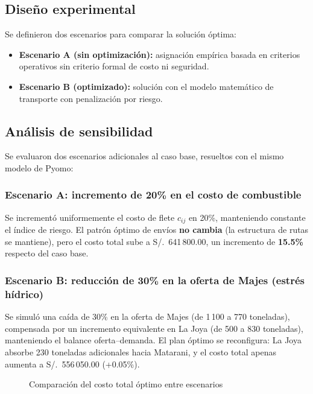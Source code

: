 \documentclass[11pt,a4paper]{article}
\begin{document}
\subsection{Dise\~no experimental}
Se definieron dos escenarios para comparar la soluci\'on \'optima:

\begin{itemize}
  \item \textbf{Escenario A (sin optimizaci\'on):} asignaci\'on emp\'irica basada en criterios operativos sin criterio formal de costo ni seguridad.
  \item \textbf{Escenario B (optimizado):} soluci\'on con el modelo matem\'atico de transporte con penalizaci\'on por riesgo.
\end{itemize}

\subsection{An\'alisis de sensibilidad}
\label{sec:sensibilidad}
Se evaluaron dos escenarios adicionales al caso base, resueltos con el mismo modelo de Pyomo:

\subsubsection*{Escenario A: incremento de 20\% en el costo de combustible}
Se increment\'o uniformemente el costo de flete $c_{ij}$ en 20\%, manteniendo constante el \'indice de riesgo. El patr\'on \'optimo de env\'ios \textbf{no cambia} (la estructura de rutas se mantiene), pero el costo total sube a S/.\ 641\,800.00, un incremento de \textbf{15.5\%} respecto del caso base.

\subsubsection*{Escenario B: reducci\'on de 30\% en la oferta de Majes (estr\'es h\'idrico)}
Se simul\'o una ca\'ida de 30\% en la oferta de Majes (de 1\,100 a 770 toneladas), compensada por un incremento equivalente en La Joya (de 500 a 830 toneladas), manteniendo el balance oferta--demanda. El plan \'optimo se reconfigura: La Joya absorbe 230 toneladas adicionales hacia Matarani, y el costo total apenas aumenta a S/.\ 556\,050.00 (+0.05\%).

\begin{figure}[h]
\centering
{}
\caption{Comparaci\'on del costo total \'optimo entre escenarios}
\label{fig:escenarios}
\end{figure}
\end{document}
